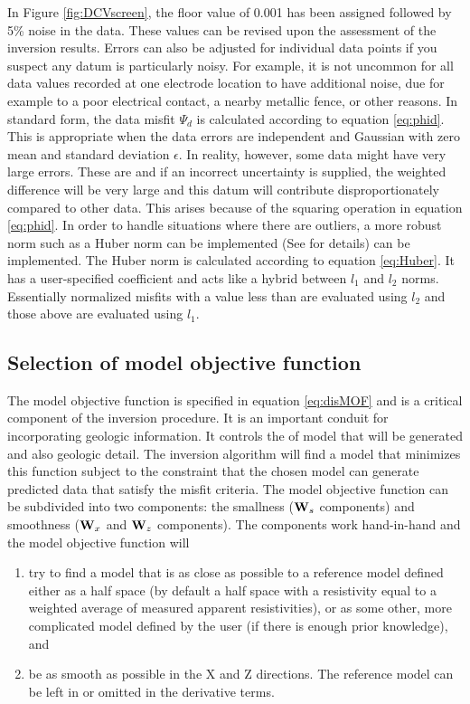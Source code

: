 In Figure \ref{fig:DCVscreen}, the floor value of 0.001 has been assigned followed by 5\% noise in the data. These values can be revised upon the assessment of the inversion results. Errors can also be adjusted for individual data points if you suspect any datum is particularly noisy. For example, it is not uncommon for all data values recorded at one electrode location to have additional noise, due for example to a poor electrical contact, a nearby metallic fence, or other reasons. In standard form, the data misfit $\Psi_d$ is calculated according to equation \ref{eq:phid}. This is appropriate when the data errors are independent and Gaussian with zero mean and standard deviation $\epsilon$. In reality, however, some data might have very large errors. These are  and if an incorrect uncertainty is supplied, the weighted difference will be very large and this datum will contribute disproportionately compared to other data. This arises because of the squaring operation in equation \ref{eq:phid}. In order to handle situations where there are outliers, a more robust norm such as a Huber norm can be implemented (See  for details) can be implemented. The Huber norm is calculated according to equation \ref{eq:Huber}. It has a user-specified coefficient  and acts like a hybrid between $l_1$ and $l_2$ norms. Essentially normalized misfits with a value less than  are evaluated using $l_2$ and those above are evaluated using $l_1$.

\subsection{Selection of model objective function}
The model objective function is specified in equation \ref{eq:disMOF} and is a critical component of the inversion procedure. It is an important conduit for incorporating geologic information. It controls the  of model that will be generated and also geologic detail. The inversion algorithm will find a model that minimizes this function subject to the constraint that the chosen model can generate predicted data that satisfy the misfit criteria. The model objective function can be subdivided into two components: the smallness ($\mathbf{W}_s$ components) and smoothness ($\mathbf{W}_x$ and $\mathbf{W}_z$ components). The components work hand-in-hand and the model objective function will 
%
\begin{enumerate}
\item try to find a model that is as close as possible to a reference model defined either as a half space (by default a half space with a resistivity equal to a weighted average of measured apparent resistivities), or as some other, more complicated model defined by the user (if there is enough prior knowledge), and
\item be as smooth as possible in the X and Z directions. The reference model can be left in or omitted in the derivative terms.
\end{enumerate}

